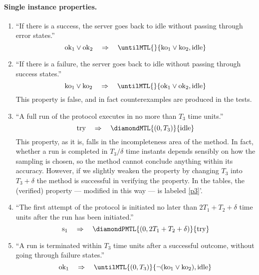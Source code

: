 \documentclass[a4paper]{article}
\newcommand{\tait}[1]{\mathrm{#1}}
\newcommand{\idle}{\tait{idle}}
\newcommand{\try}{\tait{try}}
\newcommand{\s}{\tait{s_1}}
\newcommand{\ok}{\tait{ok_1}}
\newcommand{\ko}{\tait{ko_1}}
\newcommand{\okk}{\tait{ok_2}}
\newcommand{\koo}{\tait{ko_2}}
\theoremstyle{plain}
\theoremstyle{definition}
\begin{document}
\paragraph{Single instance properties.}
\begin{enumerate}
\item \label{p1}
  ``If there is a success, the server goes back to idle without passing through error states.''
\begin{equation*}
 \ok \vee \okk \quad\Rightarrow\quad  \untilMTL{}{\ko \vee \koo ,\idle}
\end{equation*}


\item \label{p2}
  ``If there is a failure, the server goes back to idle without passing through success states.''
\begin{equation*}
 \ko \vee \koo \quad\Rightarrow\quad  \untilMTL{}{\ok \vee \okk ,\idle}
\end{equation*}
   This property is false, and in fact counterexamples are produced in the tests.

\item \label{p3}
  ``A full run of the protocol executes in no more than $T_3$ time units.''
\begin{equation*}
 \try \quad\Rightarrow\quad  \diamondMTL{(0,T_3)}{\idle}
\end{equation*}
  This property, as it is, falls in the incompleteness area of the method.
  In fact, whether a run is completed in $T_3/\delta$ time instants depends sensibly on how the sampling is chosen, so the method cannot conclude anything within its accuracy.
  However, if we slightly weaken the property by changing $T_3$ into $T_3 + \delta$ the method is successful in verifying the property.
  In the tables, the (verified) property --- modified in this way --- is labeled \ref{p3}'.

\item \label{p4}
  ``The first attempt of the protocol is initiated no later than $2T_1 + T_2 + \delta$ time units after the run has been initiated.''
\begin{equation*}
 \s \quad\Rightarrow\quad  \diamondPMTL{(0,2T_1 + T_2 + \delta)}{\try}
\end{equation*}

\item \label{p5}
  ``A run is terminated within $T_3$ time units after a successful outcome, without going through failure states.''
\begin{equation*}
 \ok \quad\Rightarrow\quad  \untilMTL{(0,T_3)}{\neg(\ko \vee \koo), \idle}
\end{equation*}
\end{enumerate}
\end{document}

